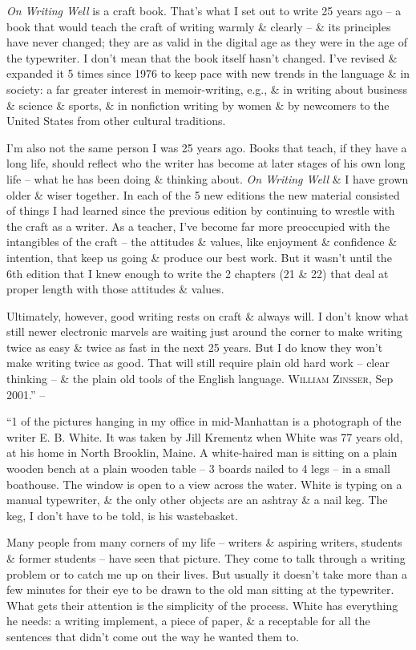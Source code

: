 \documentclass{article}
\begin{document}
\textit{On Writing Well} is a craft book. That's what I set out to write 25 years ago -- a book that would teach the craft of writing warmly \& clearly -- \& its principles have never changed; they are as valid in the digital age as they were in the age of the typewriter. I don't mean that the book itself hasn't changed. I've revised \& expanded it 5 times since 1976 to keep pace with new trends in the language \& in society: a far greater interest in memoir-writing, e.g., \& in writing about business \& science \& sports, \& in nonfiction writing by women \& by newcomers to the United States from other cultural traditions.

I'm also not the same person I was 25 years ago. Books that teach, if they have a long life, should reflect who the writer has become at later stages of his own long life -- what he has been doing \& thinking about. \textit{On Writing Well} \& I have grown older \& wiser together. In each of the 5 new editions the new material consisted of things I had learned since the previous edition by continuing to wrestle with the craft as a writer. As a teacher, I've become far more preoccupied with the intangibles of the craft -- the attitudes \& values, like enjoyment \& confidence \& intention, that keep us going \& produce our best work. But it wasn't until the 6th edition that I knew enough to write the 2 chapters (21 \& 22) that deal at proper length with those attitudes \& values.

Ultimately, however, good writing rests on craft \& always will. I don't know what still newer electronic marvels are waiting just around the corner to make writing twice as easy \& twice as fast in the next 25 years. But I do know they won't make writing twice as good. That will still require plain old hard work -- clear thinking -- \& the plain old tools of the English language. \textsc{William Zinsser}, Sep 2001.'' -- \cite[pp. ix--xii]{Zinsser2001}

``1 of the pictures hanging in my office in mid-Manhattan is a photograph of the writer E. B. White. It was taken by Jill Krementz when White was 77 years old, at his home in North Brooklin, Maine. A white-haired man is sitting on a plain wooden bench at a plain wooden table -- 3 boards nailed to 4 legs -- in a small boathouse. The window is open to a view across the water. White is typing on a manual typewriter, \& the only other objects are an ashtray \& a nail keg. The keg, I don't have to be told, is his wastebasket.

Many people from many corners of my life -- writers \& aspiring writers, students \& former students -- have seen that picture. They come to talk through a writing problem or to catch me up on their lives. But usually it doesn't take more than a few minutes for their eye to be drawn to the old man sitting at the typewriter. What gets their attention is the simplicity of the process. White has everything he needs: a writing implement, a piece of paper, \& a receptable for all the sentences that didn't come out the way he wanted them to.
\end{document}
